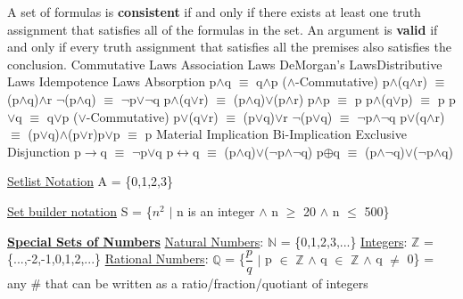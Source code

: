 \documentclass{article}
\begin{document}
\begin{tiny}
A set of formulas is \textbf{consistent} if and only if there exists at least one truth assignment that satisfies all of the formulas in the set.
An argument is \textbf{valid} if and only if every truth assignment that satisfies all the premises also satisfies the conclusion.\newline\newline
Commutative Laws \quad \quad \quad \quad \quad \quad \quad \quad Association Laws \quad \quad \quad \quad \quad  DeMorgan's Laws\quad \quad \quad  Distributive Laws \quad \quad \quad Idempotence Laws \quad \quad \quad Absorption \newline
p$\wedge$q $\equiv$ q$\wedge$p ($\wedge$-Commutative) \quad \quad \quad p$\wedge$(q$\wedge$r) $\equiv$ (p$\wedge$q)$\wedge$r  \quad \quad \quad  $\neg$(p$\wedge$q) $\equiv$ $\neg$p$\lor$$\neg$q \quad \quad \quad p$\wedge$(q$\lor$r) $\equiv$ (p$\wedge$q)$\lor$(p$\wedge$r) \quad \quad \quad p$\wedge$p $\equiv$ p \quad \quad \quad p$\wedge$(q$\lor$p) $\equiv$ p \newline
p$\lor$q $\equiv$ q$\lor$p ($\lor$-Commutative) \quad \quad \quad  p$\lor$(q$\lor$r) $\equiv$ (p$\lor$q)$\lor$r  \quad \quad \quad $\neg$(p$\lor$q) $\equiv$ $\neg$p$\wedge$$\neg$q \quad \quad \quad  p$\lor$(q$\wedge$r) $\equiv$ (p$\lor$q)$\wedge$(p$\lor$r)\quad \quad \quad p$\lor$p $\equiv$ p \quad \quad \quad  \newline\newline
Material Implication \quad \quad  Bi-Implication \quad \quad \quad \quad \quad \quad Exclusive Disjunction\newline
p$\rightarrow$q $\equiv$ $\neg$p$\lor$q \quad \quad \quad \quad p$\leftrightarrow$q $\equiv$ (p$\wedge$q)$\lor$($\neg$p$\wedge$$\neg$q)  \quad \quad \quad  p$\oplus$q $\equiv$ (p$\wedge$$\neg$q)$\lor$($\neg$p$\wedge$q) \newline

\underline{Setlist Notation}\newline
A = \{0,1,2,3\}\newline

\underline{Set builder notation}\newline
S = \{$n^2$ $\mid$ n is an integer $\wedge$ n $\geq$ 20 $\wedge$ n $\leq$ 500\}\newline

\textbf{\underline{Special Sets of Numbers}}\newline
\underline{Natural Numbers}:	$\mathbb{N}$ = \{0,1,2,3,...\}\newline
\underline{Integers}:	$\mathbb{Z}$ = \{...,-2,-1,0,1,2,...\}\newline
\underline{Rational Numbers}:	$\mathbb{Q}$ = \{$\dfrac{p}{q}$ $\mid$ p $\in$ $\mathbb{Z}$ $\wedge$ q $\in$ $\mathbb{Z}$ $\wedge$ q $\neq$ 0\}\newline
= any \# that can be written as a ratio/fraction/quotiant of integers\newline


\end{tiny}
\end{document}
